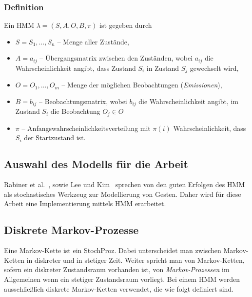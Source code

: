 \subsubsection{Definition}
Ein \gls{HMM} $\lambda = (S, A, O, B, \pi)$ ist gegeben durch
\begin{itemize}
  \item $S = {S_1,\ldots,S_n}$ -- Menge aller Zust\"ande,
  \item $A = {a_{ij}}$ -- \"Ubergangsmatrix zwischen den Zust\"anden, wobei $a_{ij}$ die Wahrscheinlichkeit angibt, dass Zustand $S_i$ in Zustand $S_j$ gewechselt wird,
  \item $O = {O_1,\ldots,O_m}$ -- Menge der m\"oglichen Beobachtungen (\textit{Emissionen}),
  \item $B = {b_{ij}}$ -- Beobachtungsmatrix, wobei $b_{ij}$ die Wahrscheinlichkeit angibt, im Zustand $S_i$ die Beobachtung $O_j \in O$
  \item $\pi$ -- Anfangswahrscheinlichkeitsverteilung mit $\pi (i)$ Wahrscheinlichkeit, dass $S_i$ der Startzustand ist.
\end{itemize}

\subsection{Auswahl des Modells f\"ur die Arbeit}
Rabiner et al.~\cite[S.~257f]{bib:hmmrabiner}, sowie Lee und Kim~\cite[S.~961]{bib:hmmlee} sprechen von den guten Erfolgen des \gls{HMM} als stochastisches Werkzeug zur Modellierung von Gesten.
Daher wird f\"ur diese Arbeit eine Implementierung mittels \acrshort{HMM} erarbeitet.

\subsection{Diskrete Markov-Prozesse}
\label{subsec:MarkovKette}
Eine Markov-Kette ist ein \gls{StochProz}. Dabei unterscheidet man zwischen Markov-Ketten in diskreter und in stetiger Zeit. Weiter spricht man von Markov-Ketten, sofern ein diskreter Zustandsraum vorhanden ist, von \textit{Markov-Prozessen} im Allgemeinen wenn ein stetiger Zustandsraum vorliegt.
\newline
Bei einem \acrshort{HMM} werden ausschlie\ss lich diskrete Markov-Ketten verwendet, die wie folgt definiert sind.

